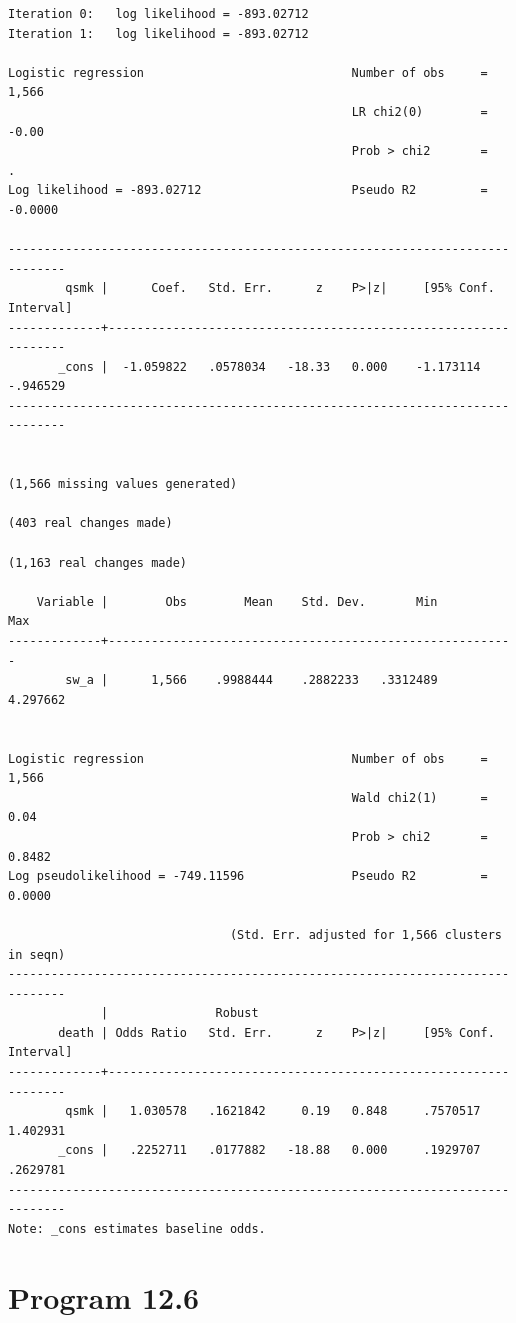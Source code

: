 \documentclass[
  10pt,
]{book}
\begin{document}
\begin{verbatim}
Iteration 0:   log likelihood = -893.02712  
Iteration 1:   log likelihood = -893.02712  

Logistic regression                             Number of obs     =      1,566
                                                LR chi2(0)        =      -0.00
                                                Prob > chi2       =          .
Log likelihood = -893.02712                     Pseudo R2         =    -0.0000

------------------------------------------------------------------------------
        qsmk |      Coef.   Std. Err.      z    P>|z|     [95% Conf. Interval]
-------------+----------------------------------------------------------------
       _cons |  -1.059822   .0578034   -18.33   0.000    -1.173114    -.946529
------------------------------------------------------------------------------


(1,566 missing values generated)

(403 real changes made)

(1,163 real changes made)

    Variable |        Obs        Mean    Std. Dev.       Min        Max
-------------+---------------------------------------------------------
        sw_a |      1,566    .9988444    .2882233   .3312489   4.297662


Logistic regression                             Number of obs     =      1,566
                                                Wald chi2(1)      =       0.04
                                                Prob > chi2       =     0.8482
Log pseudolikelihood = -749.11596               Pseudo R2         =     0.0000

                               (Std. Err. adjusted for 1,566 clusters in seqn)
------------------------------------------------------------------------------
             |               Robust
       death | Odds Ratio   Std. Err.      z    P>|z|     [95% Conf. Interval]
-------------+----------------------------------------------------------------
        qsmk |   1.030578   .1621842     0.19   0.848     .7570517    1.402931
       _cons |   .2252711   .0177882   -18.88   0.000     .1929707    .2629781
------------------------------------------------------------------------------
Note: _cons estimates baseline odds.
\end{verbatim}

\hypertarget{program-12.6}{%
\section{Program 12.6}\label{program-12.6}}
\end{document}
